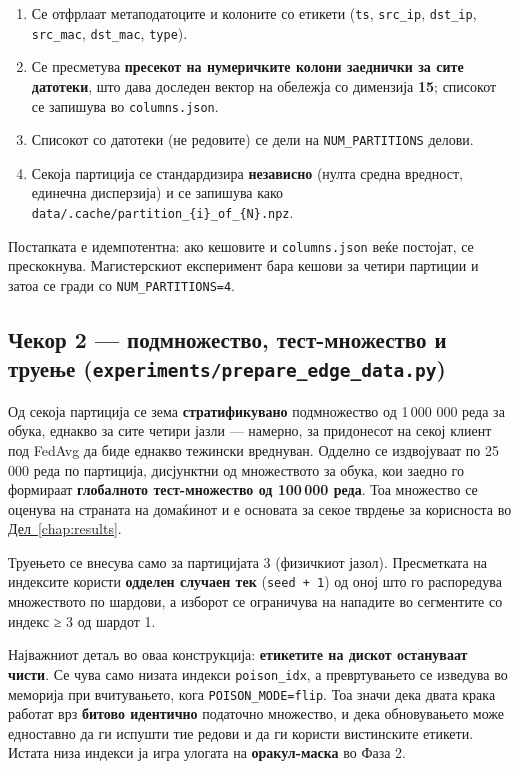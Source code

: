 \begin{enumerate}
  \item Се отфрлаат метаподатоците и колоните со етикети (\texttt{ts}, \texttt{src\_ip}, \texttt{dst\_ip}, \texttt{src\_mac}, \texttt{dst\_mac}, \texttt{type}).
  \item Се пресметува \textbf{пресекот на нумеричките колони заеднички за сите датотеки}, што дава доследен вектор на обележја со димензија \textbf{15}; списокот се запишува во \texttt{columns.json}.
  \item Списокот со датотеки (не редовите) се дели на \texttt{NUM\_PARTITIONS} делови.
  \item Секоја партиција се стандардизира \textbf{независно} (нулта средна вредност, единечна дисперзија) и се запишува како \texttt{data/.cache/partition\_\{i\}\_of\_\{N\}.npz}.
\end{enumerate}

Постапката е идемпотентна: ако кешовите и \texttt{columns.json} веќе постојат, се прескокнува.
Магистерскиот експеримент бара кешови за четири партиции и затоа се гради со
\texttt{NUM\_PARTITIONS=4}.

\subsection{Чекор 2 --- подмножество, тест-множество и труење (\texttt{experiments/prepare\_edge\_data.py})}

Од секоја партиција се зема \textbf{стратификувано} подмножество од 1\,000 000 реда за обука,
еднакво за сите четири јазли --- намерно, за придонесот на секој клиент под FedAvg да биде
еднакво тежински вреднуван. Одделно се издвојуваат по 25\,000 реда по партиција, дисјунктни
од множеството за обука, кои заедно го формираат \textbf{глобалното тест-множество од 100\,000
реда}. Тоа множество се оценува на страната на домаќинот и е основата за секое тврдење за
корисноста во \hyperref[chap:results]{Дел~\ref*{chap:results}}.

Труењето се внесува само за партицијата 3 (физичкиот јазол). Пресметката на индексите користи
\textbf{одделен случаен тек} (\texttt{seed + 1}) од оној што го распоредува множеството по шардови, а
изборот се ограничува на нападите во сегментите со индекс ≥ 3 од шардот 1.

Најважниот детаљ во оваа конструкција: \textbf{етикетите на дискот остануваат чисти}. Се чува
само низата индекси \texttt{poison\_idx}, а превртувањето се изведува во меморија при вчитувањето,
кога \texttt{POISON\_MODE=flip}. Тоа значи дека двата крака работат врз \textbf{битово идентично}
податочно множество, и дека обновувањето може едноставно да ги испушти тие редови и да ги
користи вистинските етикети. Истата низа индекси ја игра улогата на \textbf{оракул-маска} во Фаза 2.

